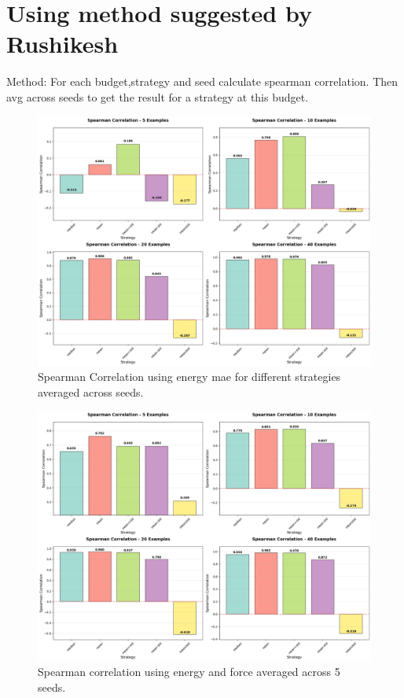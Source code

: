 \documentclass[12pt]{article}
\theoremstyle{definition}
\theoremstyle{remark}
\begin{document}
\newpage
\section{Using method suggested by Rushikesh}
Method: For each budget,strategy and seed calculate spearman correlation. Then avg across seeds to get the result for a strategy at this budget.

\begin{figure}[htbp]
    \centering
    \includegraphics[width=0.75\linewidth]{plots/spearman correlation avg.png}
    \caption{Spearman Correlation using energy mae for different strategies averaged across seeds.}
    \label{fig:placeholder}
\end{figure}
\newpage
\begin{figure}[htbp]
    \centering
    \includegraphics[width=0.75\linewidth]{plots/spearman correlation using energy mae + force mae averaged across 5 seeds.png}
    \caption{Spearman correlation using energy and force averaged across 5 seeds.}
    \label{fig:placeholder}
\end{figure}



    
\end{document}

